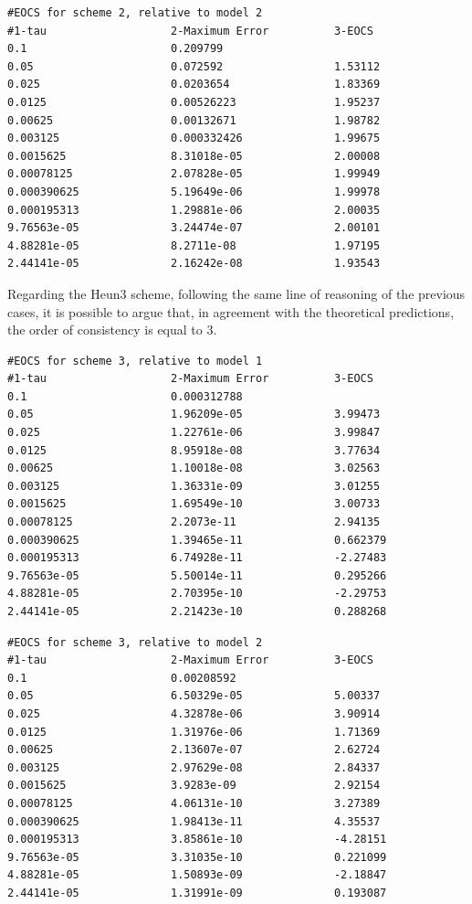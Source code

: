 \documentclass[11pt]{article}
\theoremstyle{theorem}
\theoremstyle{definition}
\begin{document}
\begin{lstlisting}
#EOCS for scheme 2, relative to model 2
#1-tau                   2-Maximum Error          3-EOCS                   
0.1                      0.209799                 	
0.05                     0.072592                 1.53112
0.025                    0.0203654                1.83369
0.0125                   0.00526223               1.95237
0.00625                  0.00132671               1.98782
0.003125                 0.000332426              1.99675
0.0015625                8.31018e-05              2.00008
0.00078125               2.07828e-05              1.99949
0.000390625              5.19649e-06              1.99978
0.000195313              1.29881e-06              2.00035
9.76563e-05              3.24474e-07              2.00101
4.88281e-05              8.2711e-08               1.97195
2.44141e-05              2.16242e-08              1.93543
\end{lstlisting}

Regarding the Heun3 scheme, following the same line of reasoning of the previous cases, it is possible to argue that, in agreement with the theoretical predictions, the order of consistency is equal to 3.\\

\begin{lstlisting}
#EOCS for scheme 3, relative to model 1
#1-tau                   2-Maximum Error          3-EOCS                   
0.1                      0.000312788              	
0.05                     1.96209e-05              3.99473
0.025                    1.22761e-06              3.99847
0.0125                   8.95918e-08              3.77634
0.00625                  1.10018e-08              3.02563
0.003125                 1.36331e-09              3.01255
0.0015625                1.69549e-10              3.00733
0.00078125               2.2073e-11               2.94135
0.000390625              1.39465e-11              0.662379
0.000195313              6.74928e-11              -2.27483
9.76563e-05              5.50014e-11              0.295266
4.88281e-05              2.70395e-10              -2.29753
2.44141e-05              2.21423e-10              0.288268
\end{lstlisting}

\begin{lstlisting}
#EOCS for scheme 3, relative to model 2
#1-tau                   2-Maximum Error          3-EOCS                   
0.1                      0.00208592               	
0.05                     6.50329e-05              5.00337
0.025                    4.32878e-06              3.90914
0.0125                   1.31976e-06              1.71369
0.00625                  2.13607e-07              2.62724
0.003125                 2.97629e-08              2.84337
0.0015625                3.9283e-09               2.92154
0.00078125               4.06131e-10              3.27389
0.000390625              1.98413e-11              4.35537
0.000195313              3.85861e-10              -4.28151
9.76563e-05              3.31035e-10              0.221099
4.88281e-05              1.50893e-09              -2.18847
2.44141e-05              1.31991e-09              0.193087
\end{lstlisting}
\end{document}

